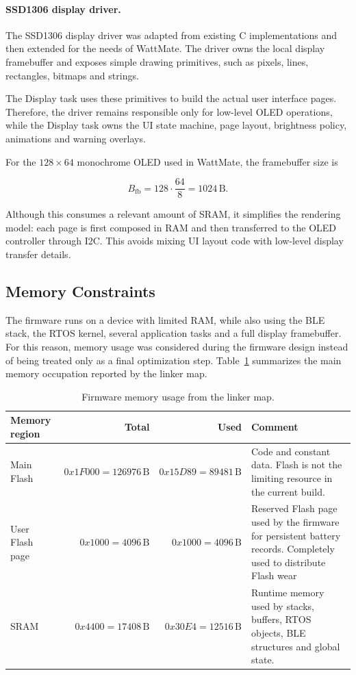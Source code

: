 \paragraph{SSD1306 display driver.}
The SSD1306 display driver was adapted from existing C implementations and then extended for the needs of WattMate. The driver owns the local display framebuffer and exposes simple drawing primitives, such as pixels, lines, rectangles, bitmaps and strings.

The Display task uses these primitives to build the actual user interface pages. Therefore, the driver remains responsible only for low-level OLED operations, while the Display task owns the UI state machine, page layout, brightness policy, animations and warning overlays.

For the \(128 \times 64\) monochrome OLED used in WattMate, the framebuffer size
is

\[
B_{\mathrm{fb}} =
128 \cdot \frac{64}{8}
=
1024\,\mathrm{B}.
\]

Although this consumes a relevant amount of SRAM, it simplifies the rendering model: each page is first composed in RAM and then transferred to the OLED controller through I2C. This avoids mixing UI layout code with low-level display transfer details.


\subsection{Memory Constraints}

The firmware runs on a device with limited RAM, while also using the BLE stack, the RTOS kernel, several application tasks and a full display framebuffer. For this reason, memory usage was considered during the firmware design instead of being treated only as a final optimization step. Table~\ref{tab:firmware_memory_overview} summarizes the main memory occupation reported by the linker map.

\begin{table}[H]
	\centering
	\small
	\caption{Firmware memory usage from the linker map.}
	\label{tab:firmware_memory_overview}
	\begin{tabularx}{\textwidth}{l r r X}
		\toprule
		\textbf{Memory region} & \textbf{Total} & \textbf{Used} & \textbf{Comment} \\
		\midrule
		Main Flash &
		\(0x1F000 = 126976\,\mathrm{B}\) &
		\(0x15D89 = 89481\,\mathrm{B}\) &
		Code and constant data. Flash is not the limiting resource in the current build. \\
		
		User Flash page &
		\(0x1000 = 4096\,\mathrm{B}\) &
		\(0x1000 = 4096\,\mathrm{B}\) &
		Reserved Flash page used by the firmware for persistent battery records. Completely used to distribute Flash wear\\
		
		SRAM &
		\(0x4400 = 17408\,\mathrm{B}\) &
		\(0x30E4 = 12516\,\mathrm{B}\) &
		Runtime memory used by stacks, buffers, RTOS objects, BLE structures and global state. \\
		\bottomrule
	\end{tabularx}
\end{table}

